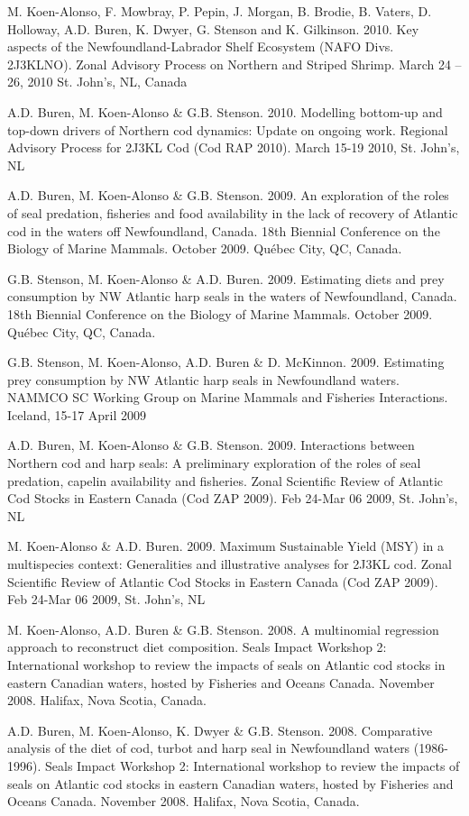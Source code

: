 \documentclass{res}
\begin{document}
\begin{resume}
\begin{hangparas}{.4in}{1}
M. Koen-Alonso, F. Mowbray, P. Pepin, J. Morgan, B. Brodie, B. Vaters, D. Holloway, A.D. Buren, K. Dwyer, G. Stenson and K. Gilkinson. 2010. Key aspects of the Newfoundland-Labrador Shelf Ecosystem (NAFO Divs. 2J3KLNO). Zonal Advisory Process on Northern and Striped Shrimp. March 24 – 26, 2010 St. John’s, NL, Canada

A.D. Buren, M. Koen-Alonso \& G.B. Stenson. 2010. Modelling bottom-up and top-down drivers of Northern cod dynamics: Update on ongoing work. Regional Advisory Process for 2J3KL Cod (Cod RAP 2010). March 15-19 2010, St. John’s, NL

A.D. Buren, M. Koen-Alonso \& G.B. Stenson. 2009. An exploration of the roles of seal predation, fisheries and food availability in the lack of recovery of Atlantic cod in the waters off Newfoundland, Canada. 18th Biennial Conference on the Biology of Marine Mammals. October 2009. Qu\'{e}bec City, QC, Canada.

G.B. Stenson, M. Koen-Alonso \& A.D. Buren. 2009. Estimating diets and prey consumption by NW Atlantic harp seals in the waters of Newfoundland, Canada. 18th Biennial Conference on the Biology of Marine Mammals. October 2009. Qu\'{e}bec City, QC, Canada.

G.B. Stenson, M. Koen-Alonso, A.D. Buren \& D. McKinnon. 2009. Estimating prey consumption by NW Atlantic harp seals in Newfoundland waters. NAMMCO SC Working Group on Marine Mammals and Fisheries Interactions. Iceland, 15-17 April 2009

A.D. Buren, M. Koen-Alonso \& G.B. Stenson. 2009. Interactions between Northern cod and harp seals: A preliminary exploration of the roles of seal predation, capelin availability and fisheries. Zonal Scientific Review of Atlantic Cod Stocks in Eastern Canada (Cod ZAP 2009). Feb 24-Mar 06 2009, St. John’s, NL

M. Koen-Alonso \& A.D. Buren. 2009. Maximum Sustainable Yield (MSY) in a multispecies context: Generalities and illustrative analyses for 2J3KL cod. Zonal Scientific Review of Atlantic Cod Stocks in Eastern Canada (Cod ZAP 2009). Feb 24-Mar 06 2009, St. John’s, NL

M. Koen-Alonso, A.D. Buren \& G.B. Stenson. 2008. A multinomial regression approach to reconstruct diet composition. Seals Impact Workshop 2: International workshop to review the impacts of seals on Atlantic cod stocks in eastern Canadian waters, hosted by Fisheries and Oceans Canada. November 2008. Halifax, Nova Scotia, Canada.

A.D. Buren, M. Koen-Alonso, K. Dwyer \& G.B. Stenson. 2008. Comparative analysis of the diet of cod, turbot and harp seal in Newfoundland waters (1986-1996). Seals Impact Workshop 2: International workshop to review the impacts of seals on Atlantic cod stocks in eastern Canadian waters, hosted by Fisheries and Oceans Canada. November 2008. Halifax, Nova Scotia, Canada.


\end{hangparas}
\end{resume}
\end{document}
